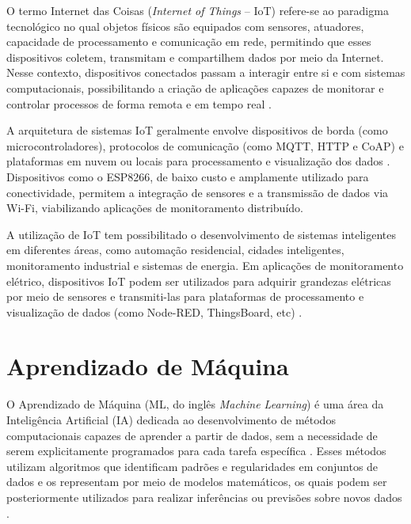 O termo Internet das Coisas (\textit{Internet of Things} – IoT) refere-se ao paradigma tecnológico no qual objetos físicos são equipados com sensores, atuadores, capacidade de processamento e comunicação em rede, permitindo que esses dispositivos coletem, transmitam e compartilhem dados por meio da Internet. Nesse contexto, dispositivos conectados passam a interagir entre si e com sistemas computacionais, possibilitando a criação de aplicações capazes de monitorar e controlar processos de forma remota e em tempo real \cite{IoT2015}.

A arquitetura de sistemas IoT geralmente envolve dispositivos de borda (como microcontroladores), protocolos de comunicação (como MQTT, HTTP e CoAP) e plataformas em nuvem ou locais para processamento e visualização dos dados \cite{Majhi2024}. Dispositivos como o ESP8266, de baixo custo e amplamente utilizado para conectividade, permitem a integração de sensores e a transmissão de dados via Wi-Fi, viabilizando aplicações de monitoramento distribuído.

A utilização de IoT tem possibilitado o desenvolvimento de sistemas inteligentes em diferentes áreas, como automação residencial, cidades inteligentes, monitoramento industrial e sistemas de energia. Em aplicações de monitoramento elétrico, dispositivos IoT podem ser utilizados para adquirir grandezas elétricas por meio de sensores e transmiti-las para plataformas de processamento e visualização de dados (como Node-RED, ThingsBoard, etc) \cite{Msane2024, ScientificReports2025}. %

\section{Aprendizado de Máquina}
O Aprendizado de Máquina (ML, do inglês \textit{Machine Learning}) é uma área da Inteligência Artificial (IA) dedicada ao desenvolvimento de métodos computacionais capazes de aprender a partir de dados, sem a necessidade de serem explicitamente programados para cada tarefa específica \cite{Samuel1959}. Esses métodos utilizam algoritmos que identificam padrões e regularidades em conjuntos de dados e os representam por meio de modelos matemáticos, os quais podem ser posteriormente utilizados para realizar inferências ou previsões sobre novos dados \cite{1deepLearningTempestade}.

